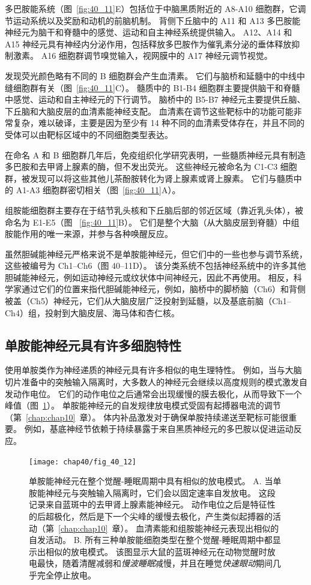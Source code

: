 多巴胺能系统（图~\ref{fig:40_11}E）包括位于中脑黑质附近的 A8-A10 细胞群，它调节运动系统以及奖励和动机的前脑机制。
背侧下丘脑中的 A11 和 A13 多巴胺能神经元为脑干和脊髓中的感觉、运动和自主神经系统提供输入。
A12、A14 和 A15 神经元具有神经内分泌作用，包括释放多巴胺作为催乳素分泌的垂体释放抑制激素。
A16 细胞群调节嗅觉输入，视网膜中的 A17 神经元调节视觉。


发现荧光颜色略有不同的 B 细胞群会产生血清素。
它们与脑桥和延髓中的中线中缝细胞群有关（图~\ref{fig:40_11}C）。
髓质中的 B1-B4 细胞群主要提供脑干和脊髓中感觉、运动和自主神经元的下行调节。
脑桥中的 B5-B7 神经元主要提供丘脑、下丘脑和大脑皮层的血清素能神经支配。
血清素在调节这些靶标中的功能可能非常复杂，难以破译，主要是因为至少有 14 种不同的血清素受体存在，并且不同的受体可以由靶标区域中的不同细胞类型表达。


在命名 A 和 B 细胞群几年后，免疫组织化学研究表明，一些髓质神经元具有制造多巴胺和去甲肾上腺素的酶，但不发出荧光。
这些神经元被命名为 C1-C3 细胞群，被发现可以将这些其他儿茶酚胺转化为肾上腺素或肾上腺素。
它们与髓质中的 A1-A3 细胞群密切相关（图~\ref{fig:40_11}A）。


组胺能细胞群主要存在于结节乳头核和下丘脑后部的邻近区域（靠近乳头体），被命名为 E1-E5（图 ~\ref{fig:40_11}B）。
它们是整个大脑（从大脑皮层到脊髓）中组胺能作用的唯一来源，并参与各种唤醒反应。


虽然胆碱能神经元严格来说不是单胺能神经元，但它们中的一些也参与调节系统，这些被编号为 Ch1–Ch6（图 40–11D）。
该分类系统不包括神经系统中的许多其他胆碱能神经元，例如运动神经元或纹状体中间神经元，因此不再使用。
相反，科学家通过它们的位置来指代胆碱能神经元，例如，脑桥中的脚桥脑（Ch6）和背侧被盖（Ch5）神经元，它们从大脑皮层广泛投射到延髓，以及基底前脑（Ch1–Ch4）组，投射到大脑皮层、海马体和杏仁核。



\subsection{单胺能神经元具有许多细胞特性}

使用单胺类作为神经递质的神经元具有许多相似的电生理特性。
例如，当与大脑切片准备中的突触输入隔离时，大多数人的神经元会继续以高度规则的模式激发自发动作电位。
它们的动作电位之后通常会出现缓慢的膜去极化，从而导致下一个峰值（图~\ref{fig:40_12}）。
单胺能神经元的自发规律放电模式受固有起搏器电流的调节（第~\ref{chap:chap10}~章）。
体内补品激发对于确保单胺持续递送至靶标可能很重要。
例如，基底神经节依赖于持续暴露于来自黑质神经元的多巴胺以促进运动反应。


\begin{figure}[htbp]
	\centering
	\texttt{[image: chap40/fig\_40\_12]}
	\caption{单胺能神经元在整个觉醒-睡眠周期中具有相似的放电模式。
		A. 当单胺能神经元与突触输入隔离时，它们会以固定速率自发放电。
		这段记录来自蓝斑中的去甲肾上腺素能神经元。
		动作电位之后是特征性的后超极化，然后是下一个尖峰的缓慢去极化，产生类似起搏器的活动（第~\ref{chap:chap10}~章）。
		血清素能和组胺能神经元表现出相似的自发活动。
		B. 所有三种单胺能细胞类型在整个觉醒-睡眠周期中都显示出相似的放电模式。
		该图显示大鼠的蓝斑神经元在动物觉醒时放电最快，随着清醒减弱和\textit{慢波睡眠}减慢，并且在睡觉\textit{快速眼动}期间几乎完全停止放电\cite{aston1981activity}。}
	\label{fig:40_12}
\end{figure}


